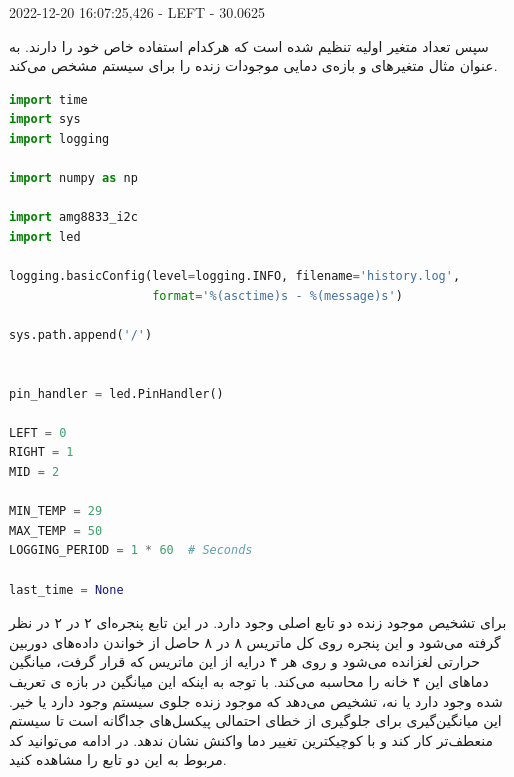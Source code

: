 \begin{latin}
    2022-12-20 16:07:25,426 - LEFT - 30.0625
\end{latin}

سپس تعداد متغیر اولیه تنظیم شده است که هرکدام استفاده خاص خود را دارند. به عنوان مثال متغیرهای  و  بازه‌ی دمایی موجودات زنده را برای سیستم مشخص می‌کند.

\begin{latin}
\begin{lstlisting}[language=python]
import time
import sys
import logging

import numpy as np

import amg8833_i2c
import led

logging.basicConfig(level=logging.INFO, filename='history.log',
                    format='%(asctime)s - %(message)s')

sys.path.append('/')


pin_handler = led.PinHandler()

LEFT = 0
RIGHT = 1
MID = 2

MIN_TEMP = 29
MAX_TEMP = 50
LOGGING_PERIOD = 1 * 60  # Seconds

last_time = None

\end{lstlisting}
\end{latin}

برای تشخیص موجود زنده دو تابع اصلی وجود دارد. در این تابع پنجره‌ای ۲ در ۲ در نظر گرفته می‌شود و این پنجره روی کل ماتریس ۸ در ۸ حاصل از خواندن داده‌های دوربین حرارتی لغزانده می‌شود و روی هر ۴ درایه‌ از این ماتریس که قرار گرفت، میانگین دماهای این ۴ خانه را محاسبه می‌کند. با توجه به اینکه این میانگین در بازه ی تعریف شده وجود دارد یا نه، تشخیص می‌دهد که موجود زنده‌ جلوی سیستم وجود دارد یا خیر. این میانگین‌گیری برای جلوگیری از خطای احتمالی پیکسل‌های جداگانه است تا سیستم منعطف‌تر کار کند و با کوچیکترین تغییر دما واکنش نشان ندهد. در ادامه می‌توانید کد مربوط به این دو تابع را مشاهده کنید.

